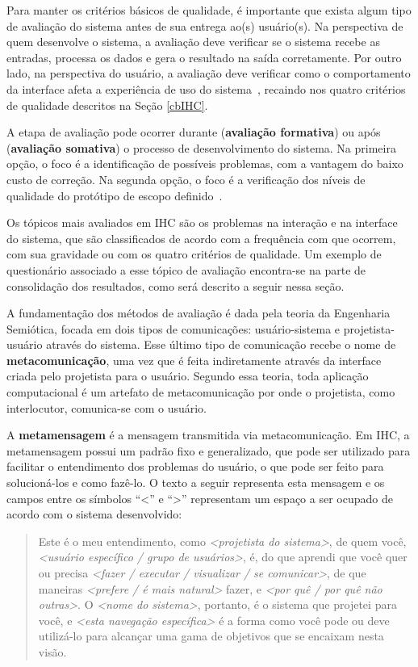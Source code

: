 \indent Para manter os critérios básicos de qualidade, é importante que exista algum tipo de avaliação do sistema antes de sua entrega ao(s) usuário(s). Na perspectiva de quem desenvolve o sistema, a avaliação deve verificar se o sistema recebe as entradas, processa os dados e gera o resultado na saída corretamente. Por outro lado, na perspectiva do usuário, a avaliação deve verificar como o comportamento da interface afeta a experiência de uso do sistema~\cite{IHCbook}, recaindo nos quatro critérios de qualidade descritos na Seção \ref{cbIHC}. 

\indent A etapa de avaliação pode ocorrer durante (\textbf{avaliação formativa}) ou após (\textbf{avaliação somativa}) o processo de desenvolvimento do sistema. Na primeira opção, o foco é a identificação de possíveis problemas, com a vantagem do baixo custo de correção. Na segunda opção, o foco é a verificação dos níveis de qualidade do protótipo de escopo definido~\cite{IHCbook}.

\indent Os tópicos mais avaliados em IHC são os problemas na interação e na interface do sistema, que são classificados de acordo com a frequência com que ocorrem, com sua gravidade ou com os quatro critérios de qualidade. Um exemplo de questionário associado a esse tópico de avaliação encontra-se na parte de consolidação dos resultados, como será descrito a seguir nessa seção.

\indent A fundamentação dos métodos de avaliação é dada pela teoria da Engenharia Semiótica, focada em dois tipos de comunicações: usuário-sistema e projetista-usuário através do sistema. Esse último tipo de comunicação recebe o nome de \textbf{metacomunicação}, uma vez que é feita indiretamente através da interface criada pelo projetista para o usuário. Segundo essa teoria, toda aplicação computacional é um artefato de metacomunicação por onde o projetista, como interlocutor, comunica-se com o usuário.

\indent A \textbf{metamensagem} é a mensagem transmitida via metacomunicação. Em IHC, a metamensagem possui um padrão fixo e generalizado, que pode ser utilizado para facilitar o entendimento dos problemas do usuário, o que pode ser feito para solucioná-los e como fazê-lo. O texto a seguir representa esta mensagem e os campos entre os símbolos ``<'' e ``>'' representam um espaço a ser ocupado de acordo com o sistema desenvolvido:

\begin{quote}
Este é o meu entendimento, como \textit{<projetista do sistema>}, de quem você, \textit{<usuário específico / grupo de usuários>}, é, do que aprendi que você quer ou precisa \textit{<fazer / executar / visualizar / se comunicar>}, de que maneiras \textit{<prefere / é mais natural>} fazer, e \textit{<por quê / por quê não outras>}. O \textit{<nome do sistema>}, portanto, é o sistema que projetei para você, e \textit{<esta navegação específica>} é a forma como você pode ou deve utilizá-lo para alcançar uma gama de objetivos que se encaixam nesta visão.
\end{quote}

